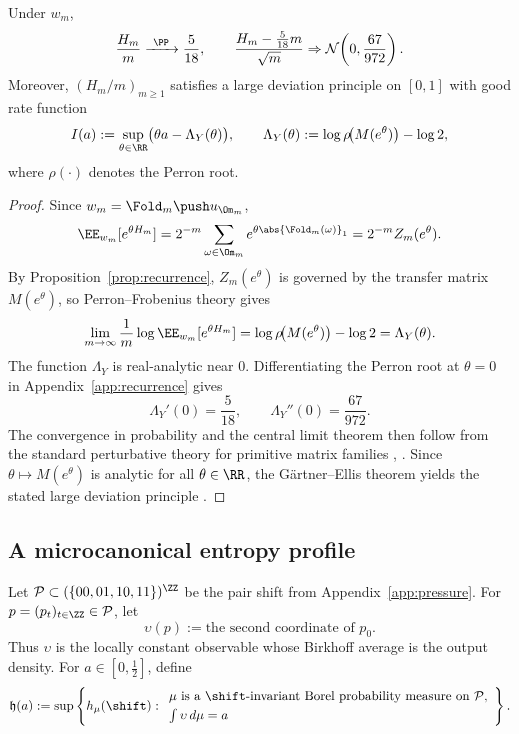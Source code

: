 \begin{corollary}\label{thm:weight-stats}
Under \(w_m\),
\[
\frac{H_m}{m}\xrightarrow{\ \PP\ }\frac{5}{18},
\qquad
\frac{H_m-\frac{5}{18}m}{\sqrt m}\Rightarrow \mathcal{N}\!\left(0,\frac{67}{972}\right).
\]
Moreover, \((H_m/m)_{m\ge1}\) satisfies a large deviation principle on \([0,1]\) with good rate function
\[
I(a):=\sup_{\theta\in\RR}\bigl(\theta a-\Lambda_Y(\theta)\bigr),
\qquad
\Lambda_Y(\theta):=\log \rho\!\bigl(M(e^\theta)\bigr)-\log 2,
\]
where \(\rho(\cdot)\) denotes the Perron root.
\end{corollary}

\begin{proof}
Since \(w_m=\Fold_m\push u_{\Om_m}\),
\[
\EE_{w_m}[e^{\theta H_m}]
=
2^{-m}\sum_{\omega\in\Om_m} e^{\theta\abs{\Fold_m(\omega)}_1}
=
2^{-m}Z_m(e^\theta).
\]
By Proposition~\ref{prop:recurrence}, \(Z_m(e^\theta)\) is governed by the transfer matrix \(M(e^\theta)\), so Perron--Frobenius theory gives
\[
\lim_{m\to\infty}\frac{1}{m}\log \EE_{w_m}[e^{\theta H_m}]
=
\log \rho\!\bigl(M(e^\theta)\bigr)-\log 2
=
\Lambda_Y(\theta).
\]
The function \(\Lambda_Y\) is real-analytic near \(0\). Differentiating the Perron root at \(\theta=0\) in Appendix~\ref{app:recurrence} gives
\[
\Lambda_Y'(0)=\frac{5}{18},
\qquad
\Lambda_Y''(0)=\frac{67}{972}.
\]
The convergence in probability and the central limit theorem then follow from the standard perturbative theory for primitive matrix families \cite[Chapter~4]{ParryPollicott1990}, \cite[Chapter~6]{Ruelle2004}. Since \(\theta\mapsto M(e^\theta)\) is analytic for all \(\theta\in\RR\), the G\"artner--Ellis theorem yields the stated large deviation principle \cite[Theorem~2.3.6]{DemboZeitouni1998}.
\end{proof}

\subsection{A microcanonical entropy profile}
\label{subsec:microcanonical}

Let \(\mathcal{P}\subset(\{00,01,10,11\})^{\ZZ}\) be the pair shift from Appendix~\ref{app:pressure}. For \(p=(p_t)_{t\in\ZZ}\in\mathcal{P}\), let
\[
\upsilon(p):=\text{the second coordinate of }p_0.
\]
Thus \(\upsilon\) is the locally constant observable whose Birkhoff average is the output density. For \(a\in[0,\frac12]\), define
\[
\mathfrak h(a):=
\sup\left\{
h_\mu(\shift):
\begin{array}{l}
\mu \text{ is a }\shift\text{-invariant Borel probability measure on }\mathcal P,\\[1mm]
\int \upsilon\,d\mu=a
\end{array}
\right\}.
\]

